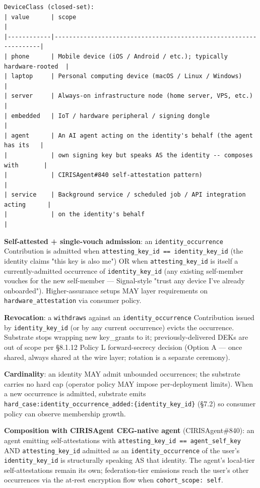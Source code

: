\documentclass[11pt]{article}
\begin{document}
\begin{lstlisting}
DeviceClass (closed-set):
| value      | scope                                                            |
|------------|------------------------------------------------------------------|
| phone      | Mobile device (iOS / Android / etc.); typically hardware-rooted  |
| laptop     | Personal computing device (macOS / Linux / Windows)              |
| server     | Always-on infrastructure node (home server, VPS, etc.)           |
| embedded   | IoT / hardware peripheral / signing dongle                       |
| agent      | An AI agent acting on the identity's behalf (the agent has its   |
|            | own signing key but speaks AS the identity -- composes with       |
|            | CIRISAgent#840 self-attestation pattern)                         |
| service    | Background service / scheduled job / API integration acting      |
|            | on the identity's behalf                                          |
\end{lstlisting}

\textbf{Self-attested + single-vouch admission}: an \texttt{identity\_occurrence} Contribution is admitted when \texttt{attesting\_key\_id == identity\_key\_id} (the identity claims "this key is also me") OR when \texttt{attesting\_key\_id} is itself a currently-admitted occurrence of \texttt{identity\_key\_id} (any existing self-member vouches for the new self-member — Signal-style "trust any device I've already onboarded"). Higher-assurance setups MAY layer requirements on \texttt{hardware\_attestation} via consumer policy.


\textbf{Revocation}: a \texttt{withdraws} against an \texttt{identity\_occurrence} Contribution issued by \texttt{identity\_key\_id} (or by any current occurrence) evicts the occurrence. Substrate stops wrapping new key\_grants to it; previously-delivered DEKs are out of scope per §8.1.12 Policy L forward-secrecy decision (Option A — once shared, always shared at the wire layer; rotation is a separate ceremony).


\textbf{Cardinality}: an identity MAY admit unbounded occurrences; the substrate carries no hard cap (operator policy MAY impose per-deployment limits). When a new occurrence is admitted, substrate emits \texttt{hard\_case:identity\_occurrence\_added:\{identity\_key\_id\}} (§7.2) so consumer policy can observe membership growth.


\textbf{Composition with CIRISAgent CEG-native agent} (CIRISAgent\#840): an agent emitting self-attestations with \texttt{attesting\_key\_id == agent\_self\_key} AND \texttt{attesting\_key\_id} admitted as an \texttt{identity\_occurrence} of the user's \texttt{identity\_key\_id} is structurally speaking AS that identity. The agent's local-tier self-attestations remain its own; federation-tier emissions reach the user's other occurrences via the at-rest encryption flow when \texttt{cohort\_scope: self}.
\end{document}
